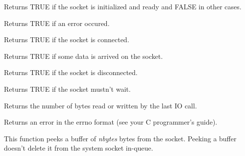 
Returns TRUE if the socket is initialized and ready and FALSE in other
cases.

\label{wxsocketbaseerror}


Returns TRUE if an error occured.

\label{wxsocketbaseconnected}


Returns TRUE if the socket is connected.

\label{wxsocketbaseerror}


Returns TRUE if some data is arrived on the socket. 

\label{wxsocketbasedisconnected}


Returns TRUE if the socket is disconnected.

\label{wxsocketbasenowait}


Returns TRUE if the socket mustn't wait.

\label{wxsocketbaselastcount}


Returns the number of bytes read or written by the last IO call.

\label{wxsocketbaselasterror}


Returns an error in the errno format (see your C programmer's guide).


%
%

\label{wxsocketbasepeek}


This function peeks a buffer of {\it nbytes} bytes from the socket. Peeking a buffer
doesn't delete it from the system socket in-queue.

